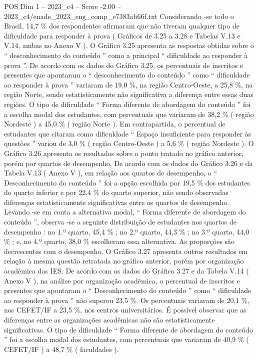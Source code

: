 \begin{textsample}{POS Dim 1 – 2023\_c4 – Score -2.00 – 2023\_c4/enade\_2023\_eng\_comp\_e7383ab66f.txt}
Considerando -se todo o Brasil, 14,7 \% dos respondentes afirmaram que não tiveram qualquer tipo de dificuldade para responder à prova ( Gráficos de 3.25 a 3.28 e Tabelas V.13 e V.14, ambas no Anexo V ).
O Gráfico 3.25 apresenta as respostas obtidas sobre o “ desconhecimento do conteúdo ” como a principal “ dificuldade ao responder à prova ”.
De acordo com os dados do Gráfico 3.25, os percentuais de inscritos e presentes que apontaram o “ desconhecimento do conteúdo ” como “ dificuldade ao responder à prova ” variaram de 19,0 \%, na região Centro-Oeste, a 25,8 \%, na região Norte, sendo estatisticamente não significativa a diferença entre essas duas regiões.
O tipo de dificuldade “ Forma diferente de abordagem do conteúdo ” foi a escolha modal dos estudantes, com percentuais que variaram de 38,2 \% ( região Nordeste ) a 45,0 \% ( região Norte ).
Em contrapartida, o percentual de estudantes que citaram como dificuldade “ Espaço insuficiente para responder às questões ” variou de 3,0 \% ( região Centro-Oeste ) a 5,6 \% ( região Nordeste ).
O Gráfico 3.26 apresenta os resultados sobre o ponto tratado no gráfico anterior, porém por quartos de desempenho.
De acordo com os dados do Gráfico 3.26 e da Tabela V.13 ( Anexo V ), em relação aos quartos de desempenho, o “ Desconhecimento do conteúdo ” foi a opção escolhida por 19,5 \% dos estudantes do quarto inferior e por 22,4 \% do quarto superior, não sendo observadas diferenças estatisticamente significativas entre os quartos de desempenho.
Levando -se em conta a alternativa modal, “ Forma diferente de abordagem do conteúdo ”, observa -se a seguinte distribuição de estudantes nos quartos de desempenho : no 1.º quarto, 45,4 \% ; no 2.º quarto, 44,3 \% ; no 3.º quarto, 44,0 \% ; e, no 4.º quarto, 38,0 \% escolheram essa alternativa.
As proporções são decrescentes com o desempenho.
O Gráfico 3.27 apresenta outros resultados em relação à mesma questão retratada no gráfico anterior, porém por organização acadêmica das IES.
De acordo com os dados do Gráfico 3.27 e da Tabela V.14 ( Anexo V ), na análise por organização acadêmica, o percentual de inscritos e presentes que apontaram o “ Desconhecimento do conteúdo ” como “ dificuldade ao responder à prova ” não superou 23,5 \%.
Os percentuais variaram de 20,1 \%, nos CEFET/IF a 23,5 \%, nos centros universitários.
É possível observar que as diferenças entre as organizações acadêmicas não são estatisticamente significativas.
O tipo de dificuldade “ Forma diferente de abordagem do conteúdo ” foi a escolha modal dos estudantes, com percentuais que variaram de 40,9 \% ( CEFET/IF ) a 48,7 \% ( faculdades ).

\end{textsample}
